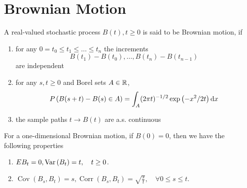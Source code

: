 \chapter{Brownian Motion}

\begin{definition}
	A real-valued stochastic process $B(t),t\geq 0$ is said to be Brownian motion, if
	\begin{enumerate}
		\item for any $0=t_{0}\leq t_{1}\leq\ldots\leq t_{n}$ the increments
		      \begin{equation*}
			      B\left(t_{1}\right)-B\left(t_{0}\right),\ldots,B\left(t_{n}\right)-B\left(t_{n-1}\right)
		      \end{equation*}
		      are independent
		\item for any $s,t\geq 0$ and Borel sets $A\in{\mathbb R}$,
		      \begin{equation}
			      P\left(B(s+t)-B(s)\in A\right)=\int_{A}(2\pi t)^{-1/2}\exp\left(-x^{2}/2t\right)\mathop{}\!\mathrm{d} x
		      \end{equation}
		\item the sample paths $t\rightarrow B(t)$ are a.s. continuous
	\end{enumerate}
\end{definition}

\begin{property}
	For a one-dimensional Brownian motion, if $B(0)=0$, then we have the following properties
	\begin{enumerate}
		\item $EB_{t}=0,\mathrm{Var}\left(B_{t}\right)=t,\quad t\geq 0$.
		\item $\operatorname{Cov}\left(B_{s},B_{t}\right)=s,\operatorname{Corr}\left(B_{s},B_{t}\right)=\sqrt{\frac{s}{t}},\quad\forall 0\leq s\leq t$.
	\end{enumerate}
\end{property}

